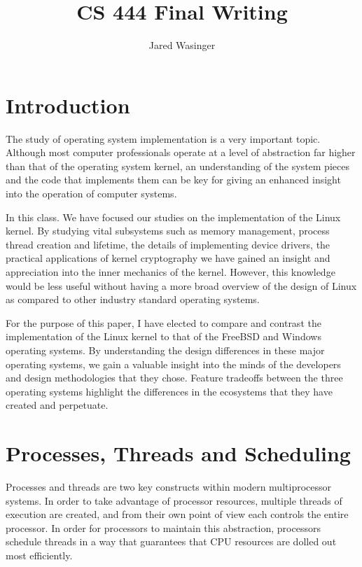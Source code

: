 \documentclass[onecolumn,10pt]{IEEETran}
\title{CS 444 Final Writing}
\author{Jared Wasinger}
\begin{document}
\maketitle


\section{Introduction}
The study of operating system implementation is a very important topic.  Although most computer professionals operate at a level of abstraction far higher than that of the operating system kernel, an understanding of the system pieces and the code that implements them can be key for giving an enhanced insight into the operation of computer systems.

In this class.  We have focused our studies on the implementation of the Linux kernel.  By studying vital subsystems such as memory management, process thread creation and lifetime, the details of implementing device drivers, the practical applications of kernel cryptography we have gained an insight and appreciation into the inner mechanics of the kernel.  However, this knowledge would be less useful without having a more broad overview of the design of Linux as compared to other industry standard operating systems.

For the purpose of this paper, I have elected to compare and contrast the implementation of the Linux kernel to that of the FreeBSD and Windows operating systems.  By understanding the design differences in these major operating systems, we gain a valuable insight into the minds of the developers and design methodologies that they chose.  Feature tradeoffs between the three operating systems highlight the differences in the ecosystems that they have created and perpetuate.

\section{Processes, Threads and Scheduling}
Processes and threads are two key constructs within modern multiprocessor systems.  In order to take advantage of processor resources, multiple threads of execution are created, and from their own point of view each controls the entire processor.  In order for processors to maintain this abstraction, processors schedule threads in a way that guarantees that CPU resources are dolled out most efficiently.
\end{document}
